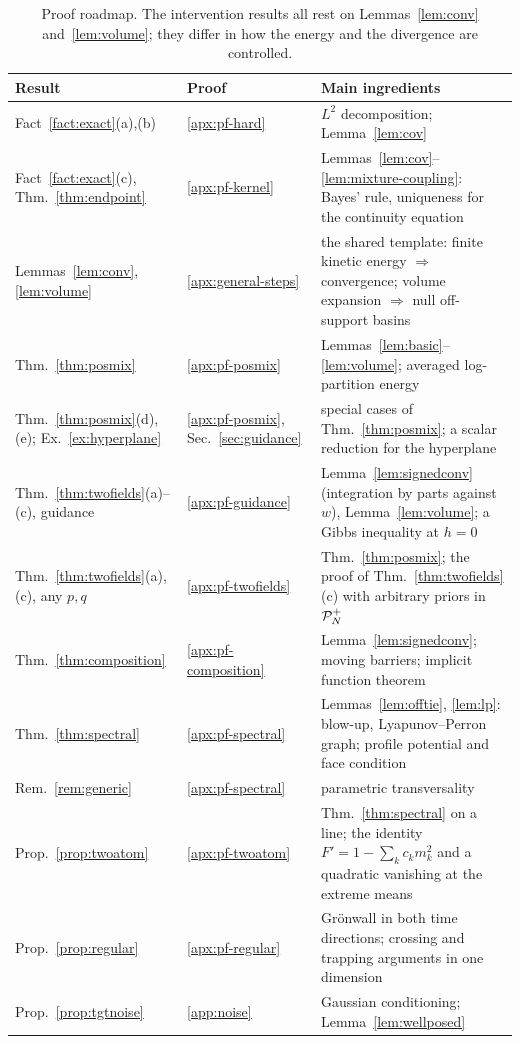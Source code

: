 \documentclass{article} %
\theoremstyle{plain}
\theoremstyle{definition}
\theoremstyle{remark}
\begin{document}
\begin{table}[h]
\centering\small
\begin{tabular}{@{}p{}p{}p{}@{}}
\toprule
Result & Proof & Main ingredients\\
\midrule
Fact~\ref{fact:exact}(a),(b) & \ref{apx:pf-hard} & $L^2$ decomposition; Lemma~\ref{lem:cov}\\
Fact~\ref{fact:exact}(c), Thm.~\ref{thm:endpoint} & \ref{apx:pf-kernel} & Lemmas~\ref{lem:cov}--\ref{lem:mixture-coupling}: Bayes' rule, uniqueness for the continuity equation\\
\addlinespace
Lemmas~\ref{lem:conv}, \ref{lem:volume} & \ref{apx:general-steps} & the shared template: finite kinetic energy $\Rightarrow$ convergence; volume expansion $\Rightarrow$ null off-support basins\\
Thm.~\ref{thm:posmix} & \ref{apx:pf-posmix} & Lemmas~\ref{lem:basic}--\ref{lem:volume}; averaged log-partition energy\\
Thm.~\ref{thm:posmix}(d),(e); Ex.~\ref{ex:hyperplane} & \ref{apx:pf-posmix}, Sec.~\ref{sec:guidance} & special cases of Thm.~\ref{thm:posmix}; a scalar reduction for the hyperplane\\
Thm.~\ref{thm:twofields}(a)--(c), guidance & \ref{apx:pf-guidance} & Lemma~\ref{lem:signedconv} (integration by parts against $w$), Lemma~\ref{lem:volume}; a Gibbs inequality at $h=0$\\
Thm.~\ref{thm:twofields}(a),(c), any $p,q$ & \ref{apx:pf-twofields} & Thm.~\ref{thm:posmix}; the proof of Thm.~\ref{thm:twofields}(c) with arbitrary priors in $\mathcal{P}_N^{+}$\\
Thm.~\ref{thm:composition} & \ref{apx:pf-composition} & Lemma~\ref{lem:signedconv}; moving barriers; implicit function theorem\\
Thm.~\ref{thm:spectral} & \ref{apx:pf-spectral} & Lemmas~\ref{lem:offtie}, \ref{lem:lp}: blow-up, Lyapunov--Perron graph; profile potential and face condition\\
Rem.~\ref{rem:generic} & \ref{apx:pf-spectral} & parametric transversality\\
Prop.~\ref{prop:twoatom} & \ref{apx:pf-twoatom} & Thm.~\ref{thm:spectral} on a line; the identity $F'=1-\sum_kc_km_k^2$ and a quadratic vanishing at the extreme means\\
\addlinespace
Prop.~\ref{prop:regular} & \ref{apx:pf-regular} & Gr\"onwall in both time directions; crossing and trapping arguments in one dimension\\
Prop.~\ref{prop:tgtnoise} & \ref{app:noise} & Gaussian conditioning; Lemma~\ref{lem:wellposed}\\
\bottomrule
\end{tabular}
\caption{Proof roadmap. The intervention results all rest on Lemmas~\ref{lem:conv}
and~\ref{lem:volume}; they differ in how the energy and the divergence are controlled.}
\label{tab:roadmap}
\end{table}
\end{document}
